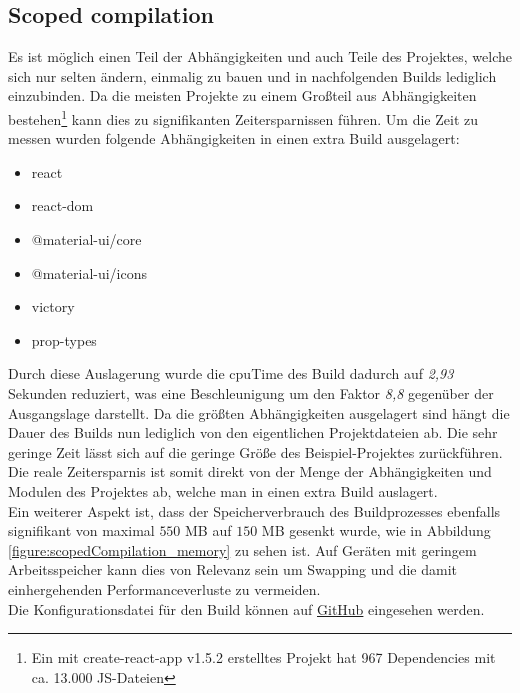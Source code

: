 \documentclass[11pt]{report}
\begin{document}
        	\subsection{Scoped compilation}
        		Es ist möglich einen Teil der Abhängigkeiten und auch Teile des Projektes, welche sich nur selten ändern, einmalig zu bauen und in nachfolgenden Builds lediglich einzubinden. Da die meisten Projekte zu einem Großteil aus Abhängigkeiten bestehen\footnote{Ein mit create-react-app v1.5.2 erstelltes Projekt hat 967 Dependencies mit ca. 13.000 JS-Dateien} kann dies zu signifikanten Zeitersparnissen führen. Um die Zeit zu messen wurden folgende Abhängigkeiten in einen extra Build ausgelagert:
        		\begin{itemize}
        			\item react
        			\item react-dom
        			\item @material-ui/core
        			\item @material-ui/icons
        			\item victory
        			\item prop-types
        		\end{itemize}
        		Durch diese Auslagerung wurde die \Gls{cpuTime} des Build dadurch auf \emph{2,93} Sekunden reduziert, was eine Beschleunigung um den Faktor \emph{8,8} gegenüber der Ausgangslage darstellt. Da die größten Abhängigkeiten ausgelagert sind hängt die Dauer des Builds nun lediglich von den eigentlichen Projektdateien ab. Die sehr geringe Zeit lässt sich auf die geringe Größe des Beispiel-Projektes zurückführen. Die reale Zeitersparnis ist somit direkt von der Menge der Abhängigkeiten und Modulen des Projektes ab, welche man in einen extra Build auslagert.\\
        		Ein weiterer Aspekt ist, dass der Speicherverbrauch des Buildprozesses ebenfalls signifikant von maximal $550$ MB auf $150$ MB gesenkt wurde, wie in Abbildung \ref{figure:scopedCompilation_memory} zu sehen ist. Auf Geräten mit geringem Arbeitsspeicher kann dies von Relevanz sein um Swapping und die damit einhergehenden Performanceverluste zu vermeiden.\\
        		Die Konfigurationsdatei für den Build können auf \href{https://github.com/TexNAK/WebBundlerOptimization/compare/master...nondestr_scopedCompilation#diff-1fb5683b1e7adbcee273b7f9f9a08a22}{GitHub} eingesehen werden.
\end{document}
